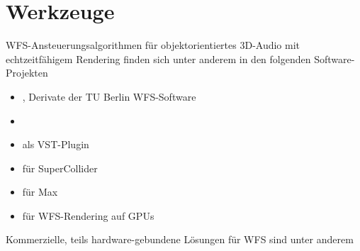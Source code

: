 \section{Werkzeuge}
\label{sec:WFS_Werkzeuge}
%
WFS-Ansteuerungsalgorithmen für objektorientiertes 3D-Audio mit
echtzeitfähigem Rendering finden sich unter anderem in den folgenden Software-Projekten
\begin{itemize}
\item \cite{url:wonder}, \cite{url:wonder_lite} Derivate der TU Berlin WFS-Software %
\item \cite{url:ssr} %
\item \cite{url:iem-wfs} als VST-Plugin
\item \cite{url:wfscollider} für SuperCollider %
\item \cite{url:wfs-diy} für Max %
\item \cite{Belloch2016_IEEE} für WFS-Rendering auf GPUs
\end{itemize}
%
%
Kommerzielle, teils hardware-gebundene Lösungen für WFS sind unter anderem
